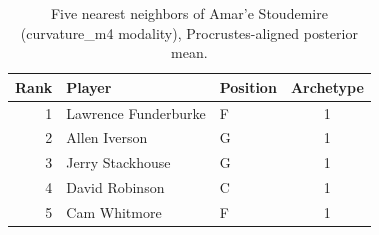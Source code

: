 \begin{table}[htbp]
  \centering\small
  \begin{tabular}{rllc}
    \toprule
    Rank & Player & Position & Archetype \\
    \midrule
    1 & Lawrence Funderburke & F & 1 \\
    2 & Allen Iverson & G & 1 \\
    3 & Jerry Stackhouse & G & 1 \\
    4 & David Robinson & C & 1 \\
    5 & Cam Whitmore & F & 1 \\
    \bottomrule
  \end{tabular}
  \caption{Five nearest neighbors of Amar'e Stoudemire (curvature_m4 modality), Procrustes-aligned posterior mean.}
  \label{tab:Amar_e_Stoudemire_neighbors_curvature_m4}
\end{table}

